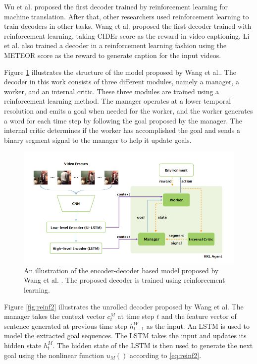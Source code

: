 \documentclass[preprint, 12pt]{elsarticle}
\begin{document}
		Wu et al. \cite{wu2016google} proposed the first decoder trained by reinforcement learning for machine translation. After that, other researchers used reinforcement learning to train decoders in other tasks. Wang et al. \cite{wang2018video} proposed the first decoder trained with reinforcement learning, taking CIDEr\cite{vedantam2015cider} score as the reward in video captioning. Li et al. \cite{li2018jointly} also trained a decoder in a reinforcement learning fashion using the METEOR \cite{banerjee2005meteor} score as the reward to generate caption for the input videos. 
		
		Figure \ref{fig:reinf1} illustrates the structure of the model proposed by Wang et al.\cite{wang2018video}. The decoder in this work consists of three different modules, namely a manager, a worker, and an internal critic. These three modules are trained using a reinforcement learning method. The manager operates at a lower temporal resolution and emits a goal when needed for the worker, and the worker generates a word for each time step by following the goal proposed by the manager. The internal critic determines if the worker has accomplished the goal and sends a binary segment signal to the manager to help it update goals. 
		
		\begin{figure}[h]
			\centering
			\includegraphics[scale=0.5]{Imgs/reinf1.png}
			\caption{An illustration of the encoder-decoder based model proposed by Wang et al. \cite{wang2018video}. The proposed decoder is trained using reinforcement learning.}
			\label{fig:reinf1}
		\end{figure}
	
		Figure \ref{fig:reinf2} illustrates the unrolled decoder proposed by Wang et al. The manager takes the context vector $c_t^M$ at time step $t$ and the feature vector of sentence generated at previous time step $h_{t-1}^W$ as the input. An LSTM is used to model the extracted goal sequences. The LSTM takes the input and updates its hidden state $h_t^M$. The hidden state of the LSTM is then used to generate the next goal using the nonlinear function $u_M()$ according to \eqref{eq:reinf2}.
		
\end{document}
